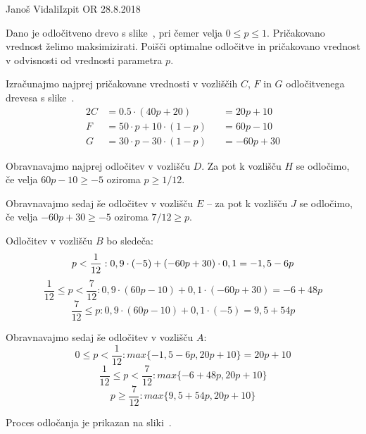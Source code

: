 \begin{naloga}{Janoš Vidali}{Izpit OR 28.8.2018}
\begin{vprasanje}
Dano je odločitveno drevo s slike~\fig,
pri čemer velja $0 \le p \le 1$.
Pričakovano vred\-nost želimo maksimizirati.
Poišči optimalne odločitve in pričakovano vrednost
v odvisnosti od vrednosti parametra $p$.

\begin{slika}
\pgfslika
{}
\end{slika}
\end{vprasanje}

\begin{odgovor}
Izračunajmo najprej pričakovane vrednosti v vozliščih $C$, $F$ in $G$
odločitvenega drevesa s slike~\fig.
\begin{alignat*}{2}
C &= 0.5 \cdot (40 p + 20) &&= 20p + 10 \\
F &= 50 \cdot p + 10 \cdot (1-p) &&= 60 p - 10 \\
G &= 30 \cdot p - 30 \cdot (1-p) &&=  -60p + 30
\end{alignat*}

Obravnavajmo najprej odločitev v vozlišču $D$.
Za pot k vozlišču $H$ se odločimo,
če velja $60p - 10 \ge -5$ oziroma $p \ge 1/12$.

Obravnavajmo sedaj še odločitev v vozlišču $E$
-- za pot k vozlišču $J$ se odločimo, če velja $-60p + 30 \ge -5$ oziroma $7/12 \ge p$.

Odločitev v vozlišču $B$ bo sledeča:
$$p < {1 \over 12}:  0,9 \cdot (-5) + (-60p + 30) \cdot 0,1 = -1,5 - 6p$$
$$\frac{1}{12} \leq p < \frac{7}{12} : 0,9 \cdot (60p - 10) + 0,1 \cdot (-60p + 30) = -6 + 48p$$
$$\frac{7}{12} \leq p : 0,9 \cdot (60p - 10) + 0,1 \cdot (-5) = 9,5 + 54 p$$

Obravnavajmo sedaj še odločitev v vozlišču $A$:
$$0 \leq p < \frac{1}{12} : max \{ -1,5 - 6p, 20p + 10 \} = 20p + 10$$
$$\frac{1}{12} \leq p < \frac{7}{12} : max \{ -6 + 48p, 20p + 10 \}$$
$$p \ge \frac{7}{12} : max \{ 9,5 + 54p, 20p + 10 \}$$

Proces odločanja je prikazan na sliki~.

\begin{slika}
\end{slika}


\end{odgovor}
\end{naloga}
